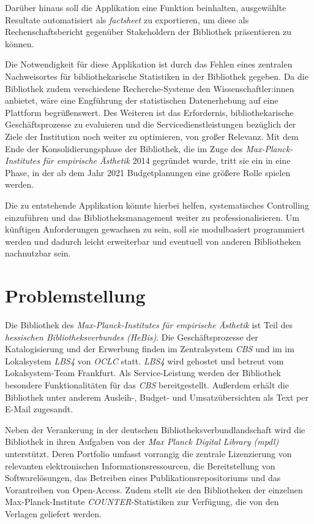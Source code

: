 Darüber hinaus soll die Applikation  eine Funktion beinhalten, ausgewählte
Resultate automatisiert als \textit{factsheet} zu exportieren, um diese
als Rechenschaftsbericht gegenüber Stakeholdern der Bibliothek präsentieren zu können.

Die Notwendigkeit für diese Applikation ist durch das
Fehlen eines zentralen Nachweisortes für bibliothekarische
Statistiken in der Bibliothek gegeben. Da die Bibliothek zudem verschiedene Recherche-Systeme den
Wissenschaftler:innen anbietet, wäre eine Engführung der statistischen
Datenerhebung auf eine Plattform begrüßenswert.
Des Weiteren ist das Erfordernis, bibliothekarische Geschäftsprozesse zu evaluieren und die
Servicedienstleistungen bezüglich der Ziele der Institution noch weiter zu
optimieren, von großer Relevanz. Mit dem Ende der Konsolidierungsphase der
Bibliothek, die im Zuge des \textit{Max-Planck-Institutes für empirische
Ästhetik} 2014 gegründet wurde, tritt sie ein in eine Phase, in der ab dem Jahr
2021 Budgetplanungen eine größere Rolle spielen werden.

Die zu entstehende Applikation könnte hierbei helfen, systematisches Controlling einzuführen und das
Bibliotheksmanagement weiter zu professionalisieren.
Um künftigen Anforderungen gewachsen zu sein, soll sie
modulbasiert programmiert werden und dadurch leicht erweiterbar und eventuell von
anderen Bibliotheken nachnutzbar sein.


\section{Problemstellung}
Die Bibliothek des \textit{Max-Planck-Institutes für empirische Ästhetik}
ist Teil des \textit{hessischen Bibliotheksverbundes (HeBis)}. Die Geschäftsprozesse
der Katalogisierung und der Erwerbung finden im Zentralsystem \textit{CBS} und im im Lokalsystem \textit{LBS4} von
\textit{OCLC} statt. \textit{LBS4} wird gehostet und betreut vom Lokalsystem-Team Frankfurt. Als Service-Leistung werden der Bibliothek besondere Funktionalitäten
für das \textit{CBS} bereitgestellt. Außerdem erhält die Bibliothek unter anderem Ausleih-, Budget- und
Umsatzübersichten als Text per E-Mail zugesandt.


Neben der Verankerung in der deutschen Bibliotheksverbundlandschaft
wird die Bibliothek in ihren Aufgaben von der
\textit{Max Planck Digital Library (mpdl)}
unterstützt. Deren Portfolio umfasst vorrangig die zentrale Lizenzierung
von relevanten elektronischen Informationsressourcen, die Bereitstellung
von Softwarelösungen, das Betreiben eines Publikationsrepositoriums und
das Vorantreiben von Open-Access. Zudem stellt sie den Bibliotheken der einzelnen Max-Planck-Institute
\textit{COUNTER}-Statistiken zur Verfügung, die von den Verlagen geliefert werden.

